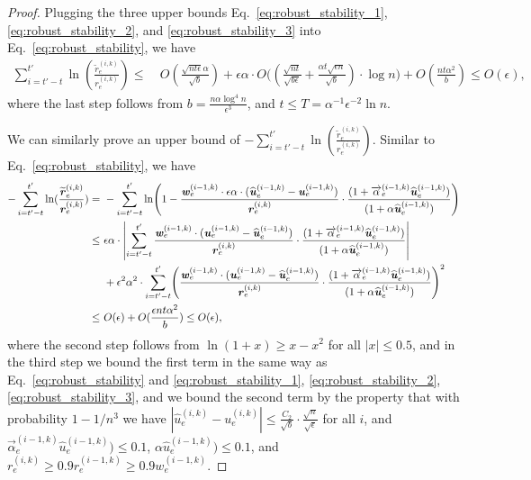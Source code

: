 \documentclass[11pt]{article}
\let\originalleft\left
\let\originalright\right
\renewcommand{\left}{\mathopen{}\mathclose\bgroup\originalleft}
\renewcommand{\right}{\aftergroup\egroup\originalright}
\newcommand\rr{\boldsymbol{\mathit{r}}}
\newcommand\uu{\boldsymbol{\mathit{u}}}
\newcommand\ww{\boldsymbol{\mathit{w}}}
\newcommand{\wh}{\widehat}
\newcommand{\wt}{\widetilde}
\begin{document}
\begin{proof}
Plugging the three upper bounds Eq.~\eqref{eq:robust_stability_1}, \eqref{eq:robust_stability_2}, and \eqref{eq:robust_stability_3} into Eq.~\eqref{eq:robust_stability}, we have
\begin{align*}
\sum_{i = t'-t}^{t'} \ln(\frac{\wt{\rr}_e^{(i,k)}}{\rr_e^{(i,k)}}) \leq &~ O( \frac{\sqrt{n t \epsilon} \alpha}{\sqrt{b}}) + \epsilon \alpha \cdot O\Big((\frac{\sqrt{nt}}{\sqrt{b \epsilon}} + \frac{\alpha t \sqrt{\epsilon n}}{\sqrt{b}})\cdot \log n \Big) + O(\frac{n t \alpha^2}{b}) 
\leq  O(\epsilon),
\end{align*}
where the last step follows from $b = \frac{n \alpha \log^4 n}{\epsilon^3}$, and $t \leq T = \alpha^{-1}\epsilon^{-2}\ln n$. 


We can similarly prove an upper bound of $-\sum_{i = t'-t}^{t'} \ln(\frac{\wt{\rr}_e^{(i,k)}}{\rr_e^{(i,k)}})$. Similar to Eq.~\eqref{eq:robust_stability}, we have
\begin{align*}
-\sum_{i = t'-t}^{t'} \ln(\frac{\wt{\rr}_e^{(i,k)}}{\rr_e^{(i,k)}}) 
= &~ -\sum_{i = t'-t}^{t'} \ln\left( 1 - \frac{\ww_e^{(i-1,k)} \cdot \epsilon \alpha \cdot ( \wh{\uu}_e^{(i-1,k)} - \uu_e^{(i-1,k)})}{\rr_e^{(i,k)}} \cdot \frac{(1 + \overrightarrow{\alpha}_e^{(i-1,k)} \wh{\uu}_e^{(i-1,k)})}{(1 + \alpha \wh{\uu}_e^{(i-1,k)})} \right)  \\
\leq &~ \epsilon \alpha \cdot \left|\sum_{i = t'-t}^{t'} \frac{\ww_e^{(i-1,k)} \cdot ( \uu_e^{(i-1,k)} - \wh{\uu}_e^{(i-1,k)})}{\rr_e^{(i,k)}} \cdot \frac{(1 + \overrightarrow{\alpha}_e^{(i-1,k)} \wh{\uu}_e^{(i-1,k)})}{(1 + \alpha \wh{\uu}_e^{(i-1,k)})} \right| \\
&~ + \epsilon^2 \alpha^2 \cdot \sum_{i = t'-t}^{t'} \left( \frac{\ww_e^{(i-1,k)} \cdot ( \uu_e^{(i-1,k)} - \wh{\uu}_e^{(i-1,k)})}{\rr_e^{(i,k)}} \cdot \frac{(1 + \overrightarrow{\alpha}_e^{(i-1,k)} \wh{\uu}_e^{(i-1,k)})}{(1 + \alpha \wh{\uu}_e^{(i-1,k)})} \right)^2 \\
\leq &~ O(\epsilon) + O(\frac{\epsilon nt \alpha^2}{b}) \leq O(\epsilon),
\end{align*}
where the second step follows from $\ln(1 + x) \geq x - x^2$ for all $|x| \leq 0.5$, and in the third step we bound the first term in the same way as Eq.~\eqref{eq:robust_stability} and \eqref{eq:robust_stability_1}, \eqref{eq:robust_stability_2}, \eqref{eq:robust_stability_3}, and we bound the second term by the property that with probability $1-1/n^3$ we have $|\wh{\uu}^{(i,k)}_e - \uu^{(i,k)}_e| \leq \frac{C_2}{\sqrt{b}} \cdot \frac{\sqrt{n}}{\sqrt{\epsilon}}$ for all $i$, and $\overrightarrow{\alpha}_e^{(i-1,k)} \wh{\uu}_e^{(i-1,k)}) \leq 0.1$, $\alpha \wh{\uu}_e^{(i-1,k)}) \leq 0.1$, and $\rr_e^{(i,k)} \geq 0.9 \rr_e^{(i-1,k)} \geq 0.9 \ww_e^{(i-1,k)}$.
\end{proof}
\end{document}
